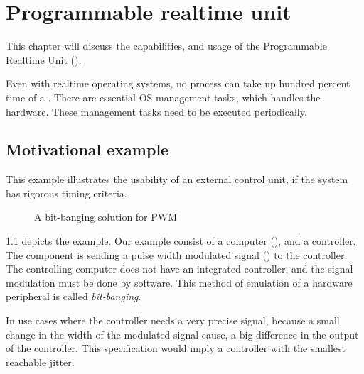 
\chapter{Programmable realtime unit}
\label{ch:pru}

This chapter will discuss the capabilities, and usage of the Programmable Realtime Unit ().

Even with realtime operating systems, no process can take up hundred percent time of a \cpu. There are essential OS management tasks, which handles the hardware. These management tasks need to be executed periodically.

\section{Motivational example}
\label{subsec:motivational_example}

This example illustrates the usability of an external control unit, if the system has rigorous timing criteria.

\begin{figure}[h]
	\centering
	\caption{A bit-banging solution for PWM}
\label{fig:example_pwm}
\end{figure}

\cref{fig:example_pwm} depicts the example. Our example consist of a computer (\rtos), and a controller. The \rtos{} component is sending a pulse width modulated signal (\pwm) to the controller. The controlling computer does not have an integrated \pwm{} controller, and the signal modulation must be done by software. This method of emulation of a hardware peripheral is called \emph{bit-banging}.

In use cases where the controller needs a very precise signal, because a small change in the width of the modulated signal cause, a big difference in the output of the controller. This specification would imply a controller with the smallest reachable jitter.

